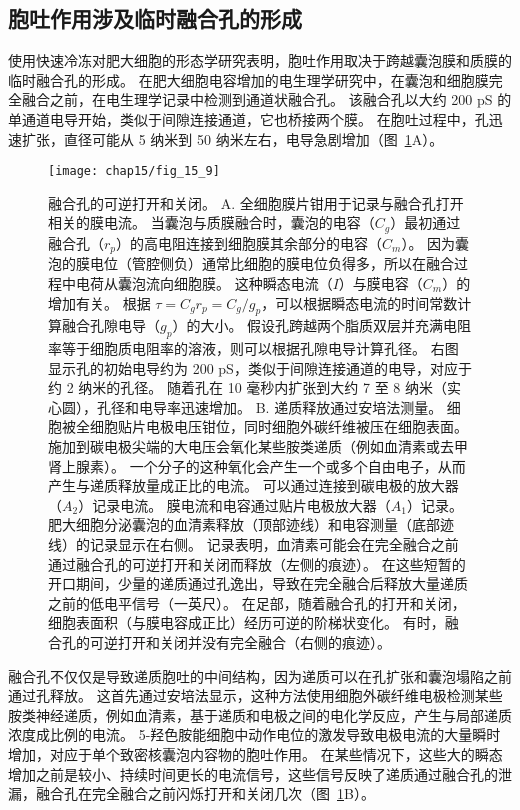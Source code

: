 \subsection{胞吐作用涉及临时融合孔的形成}

使用快速冷冻对肥大细胞的形态学研究表明，胞吐作用取决于跨越囊泡膜和质膜的临时融合孔的形成。
在肥大细胞电容增加的电生理学研究中，在囊泡和细胞膜完全融合之前，在电生理学记录中检测到通道状融合孔。 
该融合孔以大约 200 pS 的单通道电导开始，类似于间隙连接通道，它也桥接两个膜。
在胞吐过程中，孔迅速扩张，直径可能从 5 纳米到 50 纳米左右，电导急剧增加（图~\ref{fig:15_9}A）。


\begin{figure}[htbp]
	\centering
	\texttt{[image: chap15/fig\_15\_9]}
	\caption{融合孔的可逆打开和关闭。
		A. 全细胞膜片钳用于记录与融合孔打开相关的膜电流。
		当囊泡与质膜融合时，囊泡的电容（$C_g$）最初通过融合孔（$r_p$）的高电阻连接到细胞膜其余部分的电容（$C_m$）。
		因为囊泡的膜电位（管腔侧负）通常比细胞的膜电位负得多，所以在融合过程中电荷从囊泡流向细胞膜。
		这种瞬态电流（$I$）与膜电容（$C_m$）的增加有关。
		根据 $\tau = C_g r_p = C_g / g_p$，可以根据瞬态电流的时间常数计算融合孔隙电导（$g_p$）的大小。
		假设孔跨越两个脂质双层并充满电阻率等于细胞质电阻率的溶液，则可以根据孔隙电导计算孔径。
		右图显示孔的初始电导约为 200 pS，类似于间隙连接通道的电导，对应于约 2 纳米的孔径。
		随着孔在 10 毫秒内扩张到大约 7 至 8 纳米（实心圆），孔径和电导率迅速增加\cite{monck1992exocytotic,spruce1990properties}。
		B. 递质释放通过安培法测量。
		细胞被全细胞贴片电极电压钳位，同时细胞外碳纤维被压在细胞表面。
		施加到碳电极尖端的大电压会氧化某些胺类递质（例如血清素或去甲肾上腺素）。
		一个分子的这种氧化会产生一个或多个自由电子，从而产生与递质释放量成正比的电流。
		可以通过连接到碳电极的放大器（$A_2$）记录电流。
		膜电流和电容通过贴片电极放大器（$A_1$）记录。
		肥大细胞分泌囊泡的血清素释放（顶部迹线）和电容测量（底部迹线）的记录显示在右侧。
		记录表明，血清素可能会在完全融合之前通过融合孔的可逆打开和关闭而释放（左侧的痕迹）。
		在这些短暂的开口期间，少量的递质通过孔逸出，导致在完全融合后释放大量递质之前的低电平信号（一英尺）。
		在足部，随着融合孔的打开和关闭，细胞表面积（与膜电容成正比）经历可逆的阶梯状变化。
		有时，融合孔的可逆打开和关闭并没有完全融合（右侧的痕迹）。}
	\label{fig:15_9}
\end{figure}


融合孔不仅仅是导致递质胞吐的中间结构，因为递质可以在孔扩张和囊泡塌陷之前通过孔释放。
这首先通过安培法显示，这种方法使用细胞外碳纤维电极检测某些胺类神经递质，例如血清素，基于递质和电极之间的电化学反应，产生与局部递质浓度成比例的电流。
5-羟色胺能细胞中动作电位的激发导致电极电流的大量瞬时增加，对应于单个致密核囊泡内容物的胞吐作用。
在某些情况下，这些大的瞬态增加之前是较小、持续时间更长的电流信号，这些信号反映了递质通过融合孔的泄漏，融合孔在完全融合之前闪烁打开和关闭几次（图~\ref{fig:15_9}B）。


